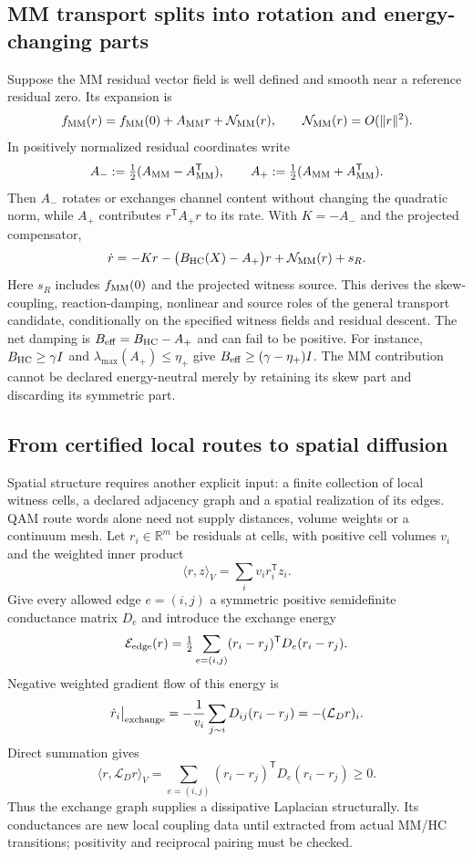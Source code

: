 \documentclass[11pt,a4paper]{article}
\begin{document}
\subsection{MM transport splits into rotation and energy-changing parts}
Suppose the MM residual vector field is well defined and smooth near a
reference residual zero. Its expansion is
\[
f_{\rm MM}(r)=f_{\rm MM}(0)+A_{\rm MM}r+\mathcal N_{\rm MM}(r),
\qquad \mathcal N_{\rm MM}(r)=O(\|r\|^2).
\]
In positively normalized residual coordinates write
\[
A_-:=\tfrac12(A_{\rm MM}-A_{\rm MM}^{\mathsf T}),\qquad
A_+:=\tfrac12(A_{\rm MM}+A_{\rm MM}^{\mathsf T}).
\]
Then $A_-$ rotates or exchanges channel content without changing the
quadratic norm, while $A_+$ contributes $r^{\mathsf T}A_+r$ to its rate.
With $K=-A_-$ and the projected compensator,
\[
\dot r=-Kr-\bigl(B_{\rm HC}(X)-A_+\bigr)r
+\mathcal N_{\rm MM}(r)+s_R.
\]
Here $s_R$ includes $f_{\rm MM}(0)$ and the projected witness source.
This derives the skew-coupling, reaction-damping, nonlinear and source
roles of the general transport candidate, conditionally on the specified
witness fields and residual descent. The net damping is
$B_{\rm eff}=B_{\rm HC}-A_+$ and can fail to be positive.
For instance, $B_{\rm HC}\ge\gamma I$ and
$\lambda_{\max}(A_+)\le\eta_+$ give
$B_{\rm eff}\ge(\gamma-\eta_+)I$.
The MM contribution cannot be declared energy-neutral merely by retaining
its skew part and discarding its symmetric part.

\subsection{From certified local routes to spatial diffusion}
Spatial structure requires another explicit input: a finite collection of
local witness cells, a declared adjacency graph and a spatial realization
of its edges. QAM route words alone need not supply distances, volume weights
or a continuum mesh. Let $r_i\in\mathbb R^m$ be residuals at cells, with
positive cell volumes $v_i$ and the weighted inner product
\[
\langle r,z\rangle_V=\sum_i v_i r_i^{\mathsf T}z_i.
\]
Give every allowed edge $e=(i,j)$ a symmetric positive semidefinite
conductance matrix $D_e$ and introduce the exchange energy
\[
\mathcal E_{\rm edge}(r)
=\tfrac12\sum_{e=(i,j)}(r_i-r_j)^{\mathsf T}D_e(r_i-r_j).
\]
Negative weighted gradient flow of this energy is
\[
\dot r_i\big|_{\rm exchange}
=-\frac1{v_i}\sum_{j\sim i}D_{ij}(r_i-r_j)
=-(\mathcal L_Dr)_i.
\]
Direct summation gives
\[
\langle r,\mathcal L_Dr\rangle_V
=\sum_{e=(i,j)}(r_i-r_j)^{\mathsf T}D_e(r_i-r_j)\ge0.
\]
Thus the exchange graph supplies a dissipative Laplacian structurally.
Its conductances are new local coupling data until extracted from actual
MM/HC transitions; positivity and reciprocal pairing must be checked.
\end{document}

